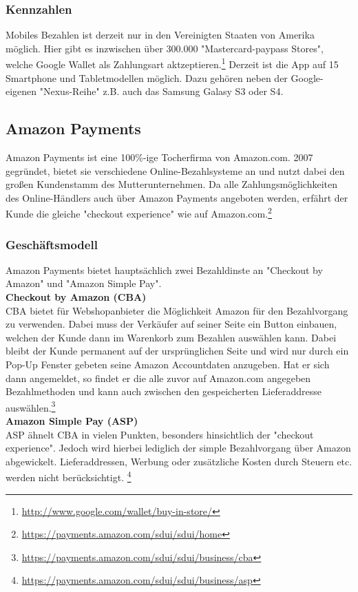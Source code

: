 \subsubsection{ Kennzahlen}
Mobiles Bezahlen ist derzeit nur in den Vereinigten Staaten von Amerika möglich. Hier gibt es inzwischen über 300.000 "Mastercard-paypass Stores", welche Google Wallet als Zahlungsart aktzeptieren.\footnote{\url{http://www.google.com/wallet/buy-in-store/}}
Derzeit ist die App auf 15 Smartphone und Tabletmodellen möglich. Dazu gehören neben der Google-eigenen "Nexus-Reihe" z.B. auch das Samsung Galasy S3 oder S4. 


\subsection{Amazon Payments}
Amazon Payments ist eine 100\%-ige Tocherfirma von Amazon.com. 2007 gegründet, bietet sie verschiedene Online-Bezahlsysteme an und nutzt dabei den großen Kundenstamm des Mutterunternehmen. Da alle Zahlungsmöglichkeiten des Online-Händlers auch über Amazon Payments angeboten werden, erfährt der Kunde die gleiche "checkout experience" wie auf Amazon.com.\footnote{\url{https://payments.amazon.com/sdui/sdui/home}}

\subsubsection{ Geschäftsmodell}
Amazon Payments bietet hauptsächlich zwei Bezahldinste an "Checkout by Amazon" und "Amazon Simple Pay".\\

\textbf{Checkout by Amazon (CBA)}\\
CBA bietet für Webshopanbieter die Möglichkeit Amazon für den Bezahlvorgang zu verwenden. Dabei muss der Verkäufer auf seiner Seite ein Button einbauen, welchen der Kunde dann im Warenkorb zum Bezahlen auswählen kann. Dabei bleibt der Kunde permanent auf der ursprünglichen Seite und wird nur durch ein Pop-Up Fenster gebeten seine Amazon Accountdaten anzugeben. Hat er sich dann angemeldet, so findet er die alle zuvor auf Amazon.com angegeben Bezahlmethoden und kann auch zwischen den gespeicherten Lieferaddresse auswählen.\footnote{\url{https://payments.amazon.com/sdui/sdui/business/cba}}\\

\textbf{Amazon Simple Pay (ASP)}\\
ASP ähnelt CBA in vielen Punkten, besonders hinsichtlich der "checkout experience". Jedoch wird hierbei lediglich der simple Bezahlvorgang über Amazon abgewickelt. Lieferaddressen, Werbung oder zusätzliche Kosten durch Steuern etc. werden nicht berücksichtigt.
\footnote{\url{https://payments.amazon.com/sdui/sdui/business/asp}}\\
	
